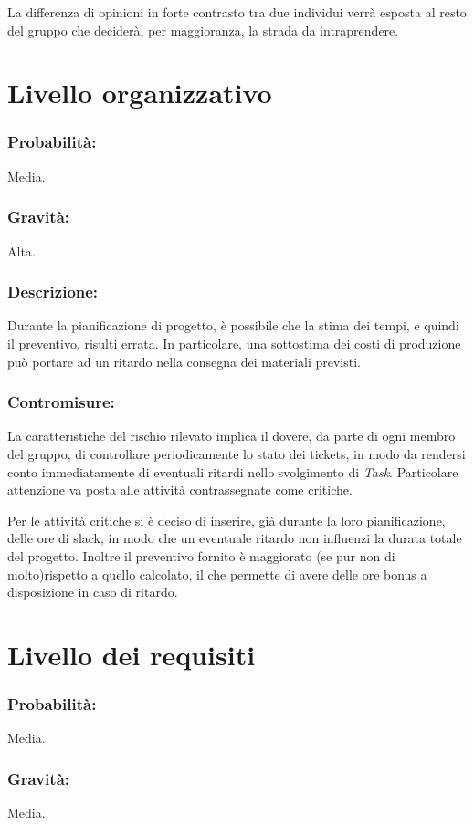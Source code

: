 \documentclass[a4paper]{report}
\begin{document}
					La differenza di opinioni in forte contrasto tra due individui verrà esposta al resto del 
					gruppo che deciderà, per maggioranza, la strada da intraprendere.
		\section{Livello organizzativo}
			\subsubsection{Probabilità:} 
				Media.
			\subsubsection{Gravità:}
				Alta.
			\subsubsection{Descrizione:}
				Durante la pianificazione di progetto, è possibile che la stima dei tempi, e quindi il
				preventivo, risulti errata. In particolare, una sottostima dei costi di produzione può 
				portare ad un ritardo nella consegna dei materiali previsti. 
			\subsubsection{Contromisure:}
				La caratteristiche del rischio rilevato implica il dovere, da parte di ogni membro del 
				gruppo, di controllare periodicamente lo stato dei tickets, in modo da rendersi conto 
				immediatamente di eventuali ritardi nello svolgimento di \emph{Task}. Particolare attenzione
				va posta alle attività contrassegnate come critiche. 
				
				Per le attività critiche si è deciso di inserire, già durante la loro pianificazione, delle 
				ore di slack, in modo che un eventuale ritardo non influenzi la durata totale del progetto. 
				Inoltre il preventivo fornito è maggiorato (se pur non di molto)rispetto a quello calcolato, 
				il che permette di avere delle ore bonus a disposizione in caso di ritardo.
		\section{Livello dei requisiti}
			\subsubsection{Probabilità:} 
				Media.
			\subsubsection{Gravità:}
				Media.
\end{document}
